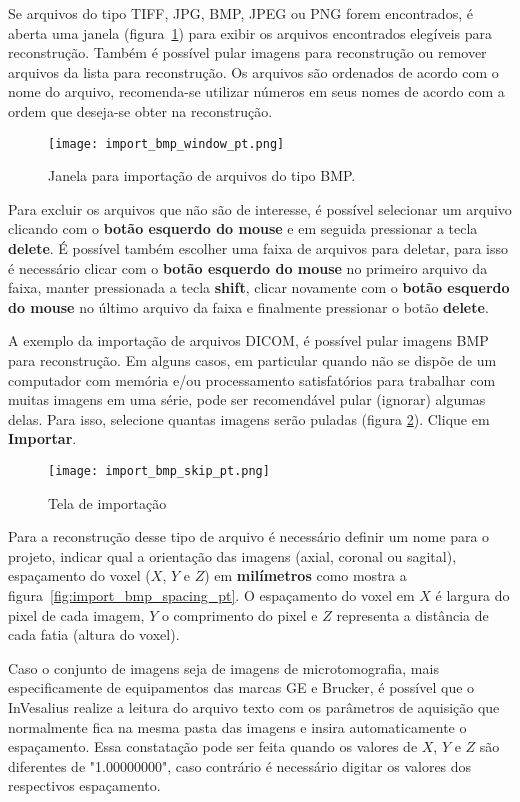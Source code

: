 Se arquivos do tipo TIFF, JPG, BMP, JPEG ou PNG  forem encontrados, é aberta uma janela (figura~\ref{fig:import_bmp_window_pt}) para exibir os arquivos encontrados elegíveis para reconstrução. Também é possível pular imagens para reconstrução ou remover arquivos da lista para reconstrução. Os arquivos são ordenados de acordo com o nome do arquivo, recomenda-se utilizar números em seus nomes de acordo com a ordem que deseja-se obter na reconstrução.

\begin{figure}[!htb]
\centering
\texttt{[image: import\_bmp\_window\_pt.png]}
\caption{Janela para importação de arquivos do tipo BMP.}
\label{fig:import_bmp_window_pt}
\end{figure}

Para excluir os arquivos que não são de interesse, é possível selecionar um arquivo clicando com o \textbf{botão esquerdo do mouse} e em seguida pressionar a tecla \textbf{delete}. É possível também escolher uma faixa de arquivos para deletar, para isso é necessário clicar com o \textbf{botão esquerdo do mouse} no primeiro arquivo da faixa, manter pressionada a tecla \textbf{shift}, clicar novamente com o \textbf{botão esquerdo do mouse} no último arquivo da faixa e finalmente pressionar o botão \textbf{delete}.
 
A exemplo da importação de arquivos DICOM, é possível pular imagens BMP para reconstrução. Em alguns casos, em particular quando não se dispõe de um computador com memória e/ou processamento satisfatórios para trabalhar com muitas imagens em uma série, pode ser recomendável pular (ignorar) algumas delas. Para isso, selecione quantas imagens serão puladas (figura \ref{fig:import_bmp_skip_pt}). Clique em \textbf{Importar}.

\begin{figure}[!htb]
\centering
\texttt{[image: import\_bmp\_skip\_pt.png]}
\caption{Tela de importação}
\label{fig:import_bmp_skip_pt}
\end{figure}

Para a reconstrução desse tipo de arquivo é necessário definir um nome para o projeto, indicar qual a orientação das imagens (axial, coronal ou sagital), espaçamento do voxel ($X$, $Y$ e $Z$) em \textbf{milímetros} como mostra a figura~\ref{fig:import_bmp_spacing_pt}. O espaçamento do voxel em $X$ é largura do pixel de cada imagem, $Y$ o comprimento do pixel e $Z$ representa a distância de cada fatia (altura do voxel). 

Caso o conjunto de imagens seja de imagens de microtomografia, mais especificamente de equipamentos das marcas GE e Brucker, é possível que o InVesalius realize a leitura do arquivo texto com os parâmetros de aquisição que normalmente fica na mesma pasta das imagens e insira automaticamente o espaçamento. Essa constatação pode ser feita quando os valores de $X$, $Y$ e $Z$ são diferentes de "1.00000000", caso contrário é necessário digitar os valores dos respectivos espaçamento. 

